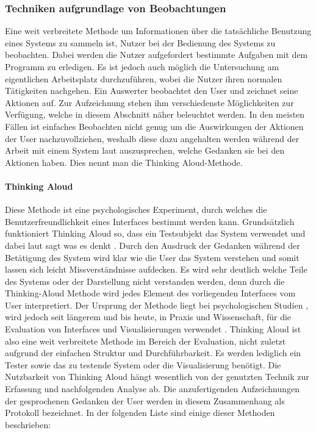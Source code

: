 \documentclass[draft=false
              ,paper=a4
              ,twoside=false
              ,fontsize=11pt
              ,headsepline
              ,BCOR10mm
              ,DIV11
              ]{scrbook}
\begin{document}
\subsubsection{Techniken aufgrundlage von Beobachtungen} %
\label{ssub:techniken_auf_grundlage_von_beobachtungen}
Eine weit verbreitete Methode um Informationen über die tatsächliche Benutzung eines Systems zu sammeln ist, Nutzer bei der Bedienung des Systems zu beobachten. Dabei werden die Nutzer aufgefordert bestimmte Aufgaben mit dem Programm zu erledigen. Es ist jedoch auch möglich die Untersuchung am eigentlichen Arbeitsplatz durchzuführen, wobei die Nutzer ihren normalen Tätigkeiten nachgehen. Ein Auswerter beobachtet den User und zeichnet seine Aktionen auf. Zur Aufzeichnung stehen ihm verschiedenste Möglichkeiten zur Verfügung, welche in diesem Abschnitt näher beleuchtet werden. In den meisten Fällen ist einfaches Beobachten nicht genug um die Auswirkungen der Aktionen der User nachzuvollziehen, weshalb diese dazu angehalten werden während der Arbeit mit einem System laut auszusprechen, welche Gedanken sie bei den Aktionen haben. Dies nennt man die Thinking Aloud-Methode. 

\paragraph{Thinking Aloud} %
\label{par:thinking_aloud}
Diese Methode ist eine psychologisches Experiment, durch welches die Benutzerfreundlichkeit eines Interfaces bestimmt werden kann. Grundsätzlich funktioniert Thinking Aloud so, dass ein Testsubjekt das System verwendet und dabei laut sagt was es denkt \cite{lewis_using_1982}. Durch den Ausdruck der Gedanken während der Betätigung des System wird klar wie die User das System verstehen und somit lassen sich leicht Missverständnisse aufdecken. Es wird sehr deutlich welche Teile des Systems oder der Darstellung nicht verstanden werden, denn durch die Thinking-Aloud Methode wird jedes Element des vorliegenden Interfaces vom User interpretiert.
Der Ursprung der Methode liegt bei psychologischen Studien \cite{ericsson_verbal_1980}, wird jedoch seit längerem und bis heute, in Praxis und Wissenschaft, für die Evaluation von Interfaces und Visualisierungen verwendet \cite{blascheck_triangulating_2016}\cite{denning_value_1990}. Thinking Aloud ist also eine weit verbreitete Methode im Bereich der Evaluation, nicht zuletzt aufgrund der einfachen Struktur und Durchführbarkeit. Es werden lediglich ein Tester sowie das zu testende System oder die Visualisierung benötigt. Die Nutzbarkeit von Thinking Aloud hängt wesentlich von der genutzten Technik zur Erfassung und nachfolgenden Analyse ab. Die anzufertigenden Aufzeichnungen der gesprochenen Gedanken der User werden in diesem Zusammenhang als Protokoll bezeichnet. In der folgenden Liste sind einige dieser Methoden beschrieben:
\end{document}
